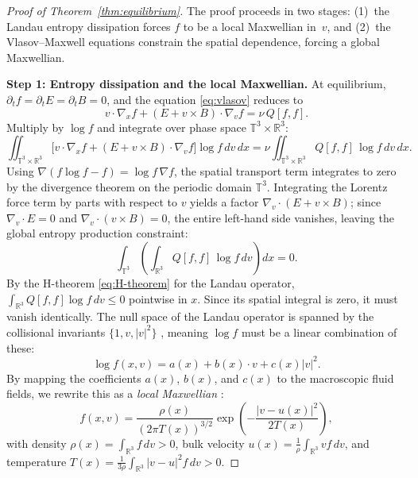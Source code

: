 \documentclass[]{article}
\newcommand{\R}{\mathbb{R}}
\numberwithin{equation}{section}
\begin{document}
\begin{proof}[Proof of Theorem~\ref{thm:equilibrium}]
The proof proceeds in two stages: (1)~the Landau entropy dissipation forces $f$ to be a local Maxwellian in~$v$, and (2)~the Vlasov--Maxwell equations constrain the spatial dependence, forcing a global Maxwellian.

\textbf{Step 1: Entropy dissipation and the local Maxwellian.}
At equilibrium, $\partial_t f = \partial_t E = \partial_t B = 0$, and the equation \eqref{eq:vlasov}  reduces to
\begin{equation}
\label{eq:steady_vlasov}
v \cdot \nabla_x f + (E + v \times B) \cdot \nabla_v f = \nu \, Q[f, f].
\end{equation}
Multiply by $\log f$ and integrate over phase space $\mathbb{T}^3 \times \R^3$:
\[
\iint_{\mathbb{T}^3 \times \R^3} \!\Big[ v \cdot \nabla_x f + (E + v \times B) \cdot \nabla_v f \Big] \log f \, dv \, dx = \nu \iint_{\mathbb{T}^3 \times \R^3} Q[f,f] \, \log f \, dv \, dx.
\]
Using $\nabla(f \log f - f) = \log f \, \nabla f$, the spatial transport term integrates to zero by the divergence theorem on the periodic domain $\mathbb{T}^3$.  Integrating the Lorentz force term by parts with respect to $v$ yields a factor $\nabla_v \cdot (E + v \times B)$; since $\nabla_v \cdot E = 0$ and $\nabla_v \cdot (v \times B) = 0$, the entire left-hand side vanishes, leaving the global entropy production constraint:
\begin{equation}
\label{eq:zero_dissipation}
\int_{\mathbb{T}^3} \!\left(\int_{\R^3} Q[f,f] \, \log f \, dv \right) dx = 0.
\end{equation}
By the H-theorem \eqref{eq:H-theorem} for the Landau operator, $\int_{\R^3} Q[f,f] \log f \, dv \leq 0$ pointwise in $x$.  Since its spatial integral is zero, it must vanish identically.  The null space of the Landau operator is spanned by the collisional invariants $\{1, v, |v|^2\}$ \citep{villani2002review}, meaning $\log f$ must be a linear combination of these:
\[
\log f(x,v) = a(x) + b(x) \cdot v + c(x)|v|^2.
\]
By mapping the coefficients $a(x)$, $b(x)$, and $c(x)$ to the macroscopic fluid fields, we rewrite this as a \emph{local Maxwellian} \citep[Ch.~II.7, Eq.~7.8]{cercignani1988boltzmann}:
\begin{equation}
\label{eq:local_maxwellian}
f(x, v) = \frac{\rho(x)}{(2\pi T(x))^{3/2}} \exp\!\left(-\frac{|v - u(x)|^2}{2T(x)}\right),
\end{equation}
with density $\rho(x) = \int_{\R^{3}} f \, dv > 0$, bulk velocity $u(x) = \frac{1}{\rho}\int_{\R^{3}} v f \, dv$, and temperature $T(x) = \frac{1}{3\rho}\int_{\R^{3}} |v - u|^2 f \, dv > 0$.


\end{proof}
\end{document}
